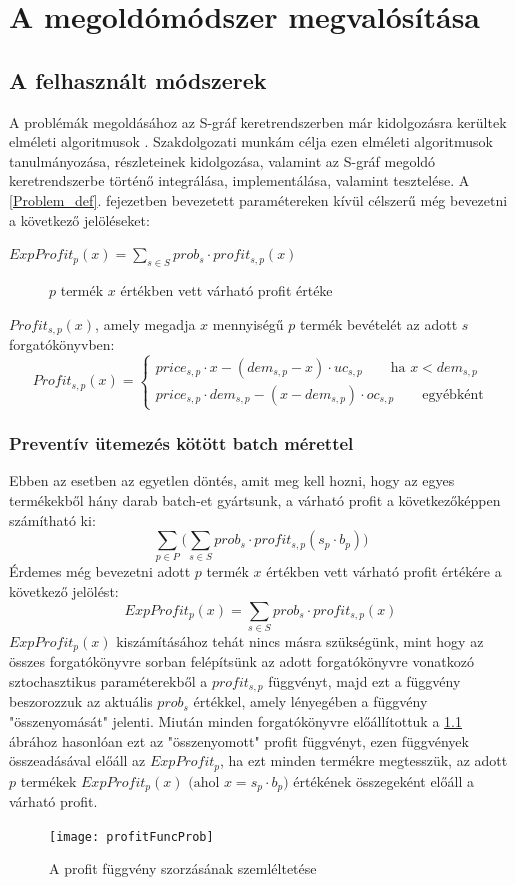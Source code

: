 \chapter{A megoldómódszer megvalósítása}  \label{Problem_impl}
\section{A felhasznált módszerek} \label{math_modells}
A problémák megoldásához az S-gráf keretrendszerben már kidolgozásra kerültek elméleti algoritmusok \cite{phd_Hegyhati}.
Szakdolgozati munkám célja ezen elméleti algoritmusok tanulmányozása, részleteinek kidolgozása, valamint az S-gráf megoldó keretrendszerbe történő integrálása, implementálása, valamint tesztelése.
A \ref{Problem_def}. fejezetben bevezetett paramétereken kívül célszerű még bevezetni a következő jelöléseket:
\begin{description}
\item[$ExpProfit_p(x)=\sum_{s \in S}prob_s \cdot profit_{s,p}(x)$]  $p$ termék $x$ értékben vett várható profit értéke
\end{description}
$Profit_{s,p}(x)$, amely megadja $x$ mennyiségű $p$ termék bevételét az adott $s$ forgatókönyvben:
\begin{equation*}
Profit_{s,p}(x)= \begin{cases}
            price_{s,p}\cdot x-(dem_{s,p}-x) \cdot uc_{s,p}\qquad \text{ha } x<dem_{s,p} \\
            price_{s,p} \cdot dem_{s,p}-(x-dem_{s,p}) \cdot oc_{s,p}\qquad \text{egyébként}
       \end{cases}
\end{equation*}
\subsection{Preventív ütemezés kötött batch mérettel} \label{FixBatchSize}
Ebben az esetben az egyetlen döntés, amit meg kell hozni, hogy az egyes termékekből hány darab batch-et gyártsunk, a várható profit a következőképpen számítható ki:
$$\sum_{p \in P}\bigg (\sum_{s \in S} prob_s \cdot profit_{s,p} (s_p \cdot b_p)\bigg)$$
Érdemes még bevezetni adott $p$ termék $x$ értékben vett várható profit értékére a következő jelölést:
$$ExpProfit_p(x)=\sum_{s \in S}prob_s \cdot profit_{s,p}(x)$$
$ExpProfit_p(x)$ kiszámításához tehát nincs másra szükségünk, mint hogy az összes forgatókönyvre sorban felépítsünk az adott forgatókönyvre vonatkozó sztochasztikus paraméterekből a $profit_{s,p}$ függvényt, majd ezt a függvény beszorozzuk az aktuális $prob_s$ értékkel, amely lényegében a függvény "összenyomását" jelenti. 
Miután minden forgatókönyvre előállítottuk a \ref{profit_func_prob} ábrához hasonlóan ezt az "összenyomott" profit függvényt, ezen függvények összeadásával előáll az $ExpProfit_p$, ha ezt minden termékre megtesszük, az adott $p$ termékek $ExpProfit_p(x) \text{ (ahol }x=s_p \cdot b_p)$ értékének összegeként előáll a várható profit.
\begin{figure}[H]
\begin{center}
\texttt{[image: profitFuncProb]}
\caption{A profit függvény szorzásának szemléltetése}
\label{profit_func_prob}
\end{center}
\end{figure}
